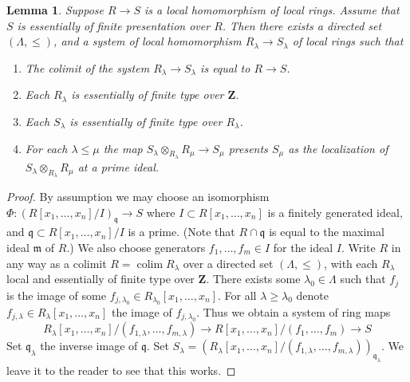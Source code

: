 \documentclass[10pt,a4paper]{amsart}
\theoremstyle{plain}
\newtheorem{lemma}[subsection]{Lemma}
\theoremstyle{definition}
\theoremstyle{remark}
\numberwithin{equation}{subsection}
\def\colim{\mathop{\mathrm{colim}}\nolimits}
\begin{document}
\begin{lemma}
\label{lemma-limit-essentially-finite-presentation}
Suppose $R \to S$ is a local homomorphism of local rings.
Assume that $S$ is essentially of finite presentation over $R$.
Then there exists a directed set $(\Lambda, \leq)$, and
a system of local homomorphism $R_\lambda \to S_\lambda$
of local rings such that
\begin{enumerate}
\item The colimit of the system $R_\lambda \to S_\lambda$
is equal to $R \to S$.
\item Each $R_\lambda$ is essentially of finite type
over $\mathbf{Z}$.
\item Each $S_\lambda$ is essentially of finite type
over $R_\lambda$.
\item For each $\lambda \leq \mu$ the map
$S_\lambda \otimes_{R_\lambda} R_\mu \to S_\mu$
presents $S_\mu$ as the localization of
$S_\lambda \otimes_{R_\lambda} R_\mu$
at a prime ideal.
\end{enumerate}
\end{lemma}

\begin{proof}
By assumption we may choose an isomorphism
$\Phi : (R[x_1, \ldots, x_n]/I)_{\mathfrak q} \to S$
where $I \subset R[x_1, \ldots, x_n]$ is a finitely generated ideal,
and $\mathfrak q \subset R[x_1, \ldots, x_n]/I$ is a prime.
(Note that $R \cap \mathfrak q$
is equal to the maximal ideal $\mathfrak m$ of $R$.)
We also choose generators $f_1, \ldots, f_m \in I$ for the ideal $I$.
Write $R$ in any way as a colimit $R = \colim R_\lambda$
over a directed set $(\Lambda, \leq )$, with each $R_\lambda$
local and essentially of finite type over $\mathbf{Z}$.
There exists some $\lambda_0 \in \Lambda$ such that $f_j$ is the image
of some $f_{j, \lambda_0} \in R_{\lambda_0}[x_1, \ldots, x_n]$.
For all $\lambda \geq \lambda_0$ denote
$f_{j, \lambda} \in R_{\lambda}[x_1, \ldots, x_n]$ the image
of $f_{j, \lambda_0}$. Thus we obtain a system of ring maps
$$
R_\lambda[x_1, \ldots, x_n]/(f_{1, \lambda}, \ldots, f_{m, \lambda})
\to
R[x_1, \ldots, x_n]/(f_1, \ldots, f_m) \to S
$$
Set $\mathfrak q_\lambda$ the inverse image of $\mathfrak q$.
Set $S_\lambda = (R_\lambda[x_1, \ldots, x_n]/
(f_{1, \lambda}, \ldots, f_{m, \lambda}))_{\mathfrak q_\lambda}$.
We leave it to the reader to see that this works.
\end{proof}
\end{document}
